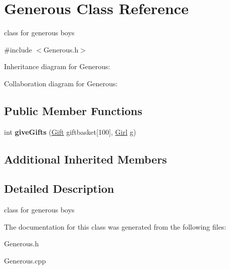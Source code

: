 \hypertarget{classGenerous}{}\section{Generous Class Reference}
\label{classGenerous}


class for generous boys  




{\ttfamily \#include $<$Generous.\+h$>$}



Inheritance diagram for Generous\+:


Collaboration diagram for Generous\+:
\subsection*{Public Member Functions}
\begin{DoxyCompactItemize}
\item 
int {\bfseries give\+Gifts} (\hyperlink{classGift}{Gift} giftbasket\mbox{[}100\mbox{]}, \hyperlink{classGirl}{Girl} g)\hypertarget{classGenerous_ad1d0d0fe4c2bf5dac2f520c216c3d5aa}{}\label{classGenerous_ad1d0d0fe4c2bf5dac2f520c216c3d5aa}

\end{DoxyCompactItemize}
\subsection*{Additional Inherited Members}


\subsection{Detailed Description}
class for generous boys 

The documentation for this class was generated from the following files\+:\begin{DoxyCompactItemize}
\item 
Generous.\+h\item 
Generous.\+cpp\end{DoxyCompactItemize}

